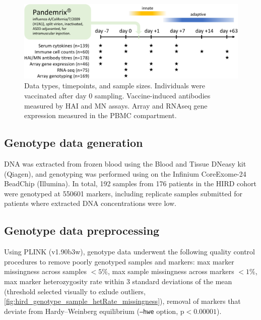 
\begin{figure}
    \includegraphics[width=1.0\textwidth]{mainmatter/figures/chapter_02/graphics_ashg19/hird_design-crop.pdf}
    \caption{Data types, timepoints, and sample sizes. Individuals were vaccinated after day 0 sampling. Vaccine-induced antibodies measured by \gls{HAI} and \gls{MN} assays. Array and \gls{RNAseq} gene expression measured in the \gls{PBMC} compartment.}
    \label{fig:hird_design}
\end{figure}

\subsection{Genotype data generation}

DNA was extracted from frozen blood using the Blood and Tissue DNeasy kit (Qiagen), and genotyping was performed using on the Infinium CoreExome-24 BeadChip (Illumina).
In total, 192 samples from 176 patients in the HIRD cohort were genotyped at 550601 markers, including replicate samples submitted for patients where extracted DNA concentrations were low.

\subsection{Genotype data preprocessing}

Using PLINK (v1.90b3w), genotype data underwent the following quality control procedures to remove poorly genotyped samples and markers:
max marker missingness across samples $< 5\%$, 
max sample missingness across markers $< 1\%$, 
max marker heterozygosity rate within 3 standard deviations of the mean (threshold selected visually to exlude outliers, \autoref{fig:hird_genotype_sample_hetRate_missingness}),
removal of markers that deviate from Hardy–Weinberg equilibrium (\texttt{--hwe} option, $\text{p} < 0.00001$).

